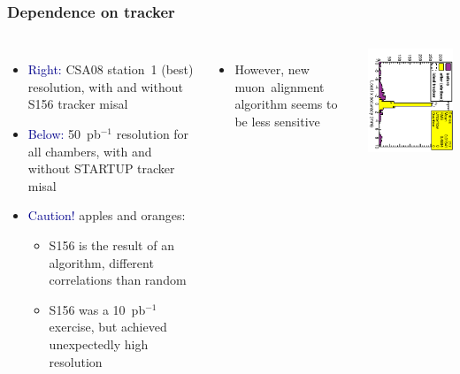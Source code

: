 \documentclass[compress]{beamer}
\begin{document}
\begin{frame}
\frametitle{Dependence on tracker}

\vspace{0.2 cm}
\begin{columns}
\begin{itemize}
\item \textcolor{darkblue}{Right:} CSA08 station~1 (best) resolution, with and without S156 tracker misal
\item \textcolor{darkblue}{Below:} 50~pb$^{-1}$ resolution for all chambers, with and without STARTUP tracker misal
\item \textcolor{darkblue}{Caution!} apples and oranges:
\begin{itemize}
\item S156 is the result of an algorithm, different correlations than random
\item S156 was a 10~pb$^{-1}$ exercise, but achieved unexpectedly high resolution
\end{itemize}
\end{itemize}

\begin{columns}
\begin{itemize}
\item However, new \mbox{muon alignment\hspace{-0.5 cm}} algorithm seems to be less sensitive
\end{itemize}


\includegraphics[height=\linewidth, angle=90]{scenario_cosmics_then_collisions_redrawn.pdf}
\end{columns}


\end{columns}
\end{frame}
\end{document}
